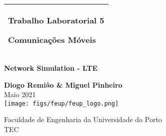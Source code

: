 %
%
%
%
%
\begin{titlepage}
  \addtolength{\hoffset}{0.5\evensidemargin-0.5\oddsidemargin} %
  \noindent%
  \begin{tabular}{@{}p{\textwidth}@{}}
    \toprule[2pt]
    \midrule
    \vspace{0.2cm}
    \begin{center}
    \Huge{\textbf{
        Trabalho Laboratorial 5 %
    }}
    \end{center}
    \begin{center}
      \Large{
        Comunicações Móveis%
      }
    \end{center}
    \vspace{0.2cm}\\
    \midrule
    \toprule[2pt]
  \end{tabular}
  \vspace{2cm}
  \begin{center}
    \Huge{\textbf{
        Network Simulation - LTE %
    }}
  \end{center}
  \vspace{2cm}
  \begin{center}
    {\Large
      \textbf{Diogo Remião \& Miguel Pinheiro} \\ %
      \vspace{0.2cm}
      {\Large
    Maio 2021  %
    }\\
      \vspace{4cm}
      \texttt{[image: figs/feup/feup\_logo.png]}
    }
  \end{center}
  \vfill
  \begin{center}
  \vspace{0.5cm}
  Faculdade de Engenharia da Universidade do Porto\\
  TEC
  \end{center}
\end{titlepage}
\clearpage

